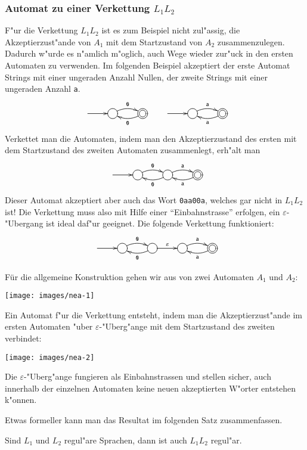 \subsubsection{Automat zu einer Verkettung $L_1L_2$}
F"ur die Verkettung $L_1L_2$ ist es zum Beispiel
nicht zul"assig, die Akzeptierzust"ande von
$A_1$ mit dem Startzustand von $A_2$ zusammenzulegen. Dadurch
w"urde es n"amlich m"oglich, auch Wege wieder zur"uck in
den ersten Automaten zu verwenden.
Im folgenden Beispiel akzeptiert der erste Automat Strings mit
einer ungeraden Anzahl Nullen, der zweite Strings mit einer
ungeraden Anzahl {\tt a}.
\[
\entrymodifiers={++[o][F]}
\xymatrix{
*+\txt{}\ar[r]
	&{} \ar@/^/[r]^{\tt 0}
		&*++[o][F=]{} \ar@/^/[l]^{\tt 0}
			&*\txt{}\ar[r]
				&{} \ar@/^/[r]^{\tt a}
					&*++[o][F=]{} \ar@/^/[l]^{\tt a }
}
\]
Verkettet man die Automaten, indem man den Akzeptierzustand des
ersten mit dem Startzustand des zweiten Automaten zusammenlegt,
erh"alt man
\[
\entrymodifiers={++[o][F]}
\xymatrix{
*+\txt{}\ar[r]
	&{} \ar@/^/[r]^{\tt 0}
		&{} \ar@/^/[l]^{\tt 0}
				 \ar@/^/[r]^{\tt a}
					&*++[o][F=]{} \ar@/^/[l]^{\tt a }
}
\]
Dieser Automat akzeptiert aber auch das Wort {\tt 0aa00a}, welches
gar nicht in $L_1L_2$ ist! Die Verkettung muss also mit Hilfe
einer ``Einbahnstrasse'' erfolgen, ein $\varepsilon$-"Ubergang
ist ideal daf"ur geeignet. Die folgende Verkettung funktioniert:
\[
\entrymodifiers={++[o][F]}
\xymatrix{
*+\txt{}\ar[r]
	&{} \ar@/^/[r]^{\tt 0}
		&{} \ar@/^/[l]^{\tt 0} \ar[r]^{\varepsilon}
			&{} \ar@/^/[r]^{\tt a}
				&*++[o][F=]{} \ar@/^/[l]^{\tt a }
}
\]

F\"ur die allgemeine Konstruktion gehen wir aus
von zwei Automaten $A_1$ und $A_2$:
\begin{center}
\texttt{[image: images/nea-1]}
\end{center}
Ein Automat f"ur die Verkettung entsteht, indem man
die Akzeptierzust"ande im ersten Automaten "uber
$\varepsilon$-"Uberg"ange mit dem
Startzustand des zweiten verbindet:
\begin{center}
\texttt{[image: images/nea-2]}
\end{center}
Die $\varepsilon$-"Uberg"ange
fungieren als Einbahnstrassen und stellen sicher, auch innerhalb der
einzelnen Automaten keine neuen akzeptierten W"orter entstehen k"onnen.

Etwas formeller kann man das Resultat im folgenden Satz zusammenfassen.

\begin{satz}
\label{satz_concat}
Sind $L_1$ und $L_2$ regul"are Sprachen, dann ist auch $L_1L_2$
regul"ar.
\end{satz}

